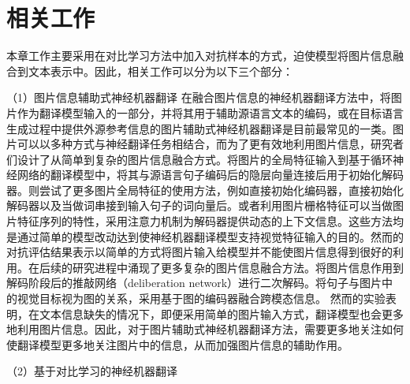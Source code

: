 \section{相关工作}
本章工作主要采用在对比学习方法中加入对抗样本的方式，迫使模型将图片信息融合到文本表示中。因此，相关工作可以分为以下三个部分：

{\sffamily （1）图片信息辅助式神经机器翻译}
在融合图片信息的神经机器翻译方法中，将图片作为翻译模型输入的一部分，并将其用于辅助源语言文本的编码，或在目标语言生成过程中提供外源参考信息的图片辅助式神经机器翻译是目前最常见的一类。图片可以以多种方式与神经翻译任务相结合，而为了更有效地利用图片信息，研究者们设计了从简单到复杂的图片信息融合方式。将图片的全局特征输入到基于循环神经网络的翻译模型中，将其与源语言句子编码后的隐层向量连接后用于初始化解码器。则尝试了更多图片全局特征的使用方法，例如直接初始化编码器，直接初始化解码器以及当做词串接到输入句子的词向量后。或者利用图片栅格特征可以当做图片特征序列的特性，采用注意力机制为解码器提供动态的上下文信息。这些方法均是通过简单的模型改动达到使神经机器翻译模型支持视觉特征输入的目的。然而的对抗评估结果表示以简单的方式将图片输入给模型并不能使图片信息得到很好的利用。在后续的研究进程中涌现了更多复杂的图片信息融合方法。将图片信息作用到解码阶段后的推敲网络（deliberation network）进行二次解码。将句子与图片中的视觉目标视为图的关系，采用基于图的编码器融合跨模态信息。
然而的实验表明，在文本信息缺失的情况下，即便采用简单的图片输入方式，翻译模型也会更多地利用图片信息。因此，对于图片辅助式神经机器翻译方法，需要更多地关注如何使翻译模型更多地关注图片中的信息，从而加强图片信息的辅助作用。

{\sffamily （2）基于对比学习的神经机器翻译}

